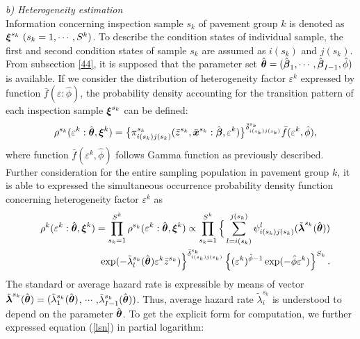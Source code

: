 \textit{b) Heterogeneity estimation}\\
Information concerning inspection sample $s_k$ of pavement group $k$ is denoted as $\mbox{\boldmath$\xi$}^{s_{k}}~(s_{k}=1,\cdots,S^k)$. To describe the condition states of individual sample, the first and second condition states of sample $s_k$ are assumed as $i(s_k)$ and $j(s_k)$. From subsection \ref{44}, it is supposed that the parameter set $\hat{\mbox{\boldmath$\theta$}}=(\hat{\mbox{\boldmath$\beta$}}_1,\cdots,\hat{\mbox{\boldmath$\beta$}}_{I-1},\hat{\phi})$ is available. If we consider the distribution of heterogeneity factor $\varepsilon^k$ expressed by function $\bar{f} (\varepsilon:\hat{\phi})$, the probability density accounting for the transition pattern of each inspection sample $\mbox{\boldmath$\xi$}^{s_{k}}$ can be defined:
%
\begin{eqnarray}
      && \rho^{s_k}(\varepsilon^k:\hat{\mbox{\boldmath$\theta$}},\mbox{\boldmath$\xi$}^k) = \big\{\pi_{i(s_{k})j(s_{k})}^{s_k}(\bar{z}^{s_k},\bar{\mbox{\boldmath$x$}}^{s_{k}}:
\hat{\mbox{\boldmath$\beta$}},\varepsilon^k)\big\}^{\bar{\delta}_{i(s_{k})j(s_{k})}^{s_{k}}} \bar{f}(\varepsilon^k,\hat{\phi}) ,
\end{eqnarray}
where function $\bar{f}(\varepsilon^k,\hat{\phi})$ follows Gamma function as previously described. Further consideration for the entire sampling population in pavement group $k$, it is able to expressed the simultaneous occurrence probability density function concerning heterogeneity factor $\varepsilon^k$ as
\begin{eqnarray}
      && \rho^k(\varepsilon^k:\hat{\mbox{\boldmath$\theta$}},\mbox{\boldmath$\xi$}^k) = \prod_{s_{k}=1}^{S^k}\rho^{s_k}(\varepsilon^k:\hat{\mbox{\boldmath$\theta$}},\mbox{\boldmath$\xi$}^k)  
 \propto \prod_{s_{k}=1}^{S^k} \Big\{ \sum_{l=i(s_{k})}^{j(s_{k})}\psi_{i(s_{k})j(s_{k})}^l(\tilde{\mbox{\boldmath$\lambda$}}^{s_{k}}(\hat{\mbox{\boldmath$\theta$}}))\nonumber\\
&& \hspace{5mm} \exp (-\tilde{\lambda}_{l}^{s_{k}}(\hat{\mbox{\boldmath$\theta$}})\varepsilon^k \bar{z}^{s_{k}}) \Big\}^{\bar{\delta}_{i(s_{k})j(s_{k})}^{s_{k}}} 
\left\{(\varepsilon^k)^{\hat{\phi}-1}\exp(-\hat{\phi} \varepsilon^k)\right\}^{S_k}. \label{lsn} 
\end {eqnarray}
The standard or average hazard rate is expressible by means of vector $\tilde{\mbox{\boldmath$\lambda$}}^{s_{k}}(\hat{\mbox{\boldmath$\theta$}}) = (\tilde{\lambda}_1^{s_{k}} (\hat{\mbox{\boldmath$\theta$}})$, $\cdots$ ,$ \tilde{\lambda}_{I-1}^{s_{k}} (\hat{\mbox{\boldmath$\theta$}}))$. Thus, average hazard rate $\tilde{\lambda}_i^{s_{k}} $ is understood to depend on the parameter $\hat{\mbox{\boldmath$\theta$}}$. To get the explicit form for computation, we further expressed equation (\ref{lsn}) in partial logarithm:
